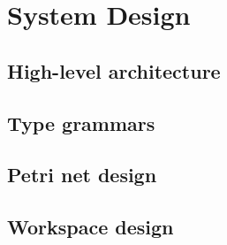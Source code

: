 \documentclass[../Dissertation.tex]{subfiles}
\begin{document}
\section{System Design}
\subsection{High-level architecture}

\subsection{Type grammars}



\subsection{Petri net design}
\subsection{Workspace design}
\end{document}
